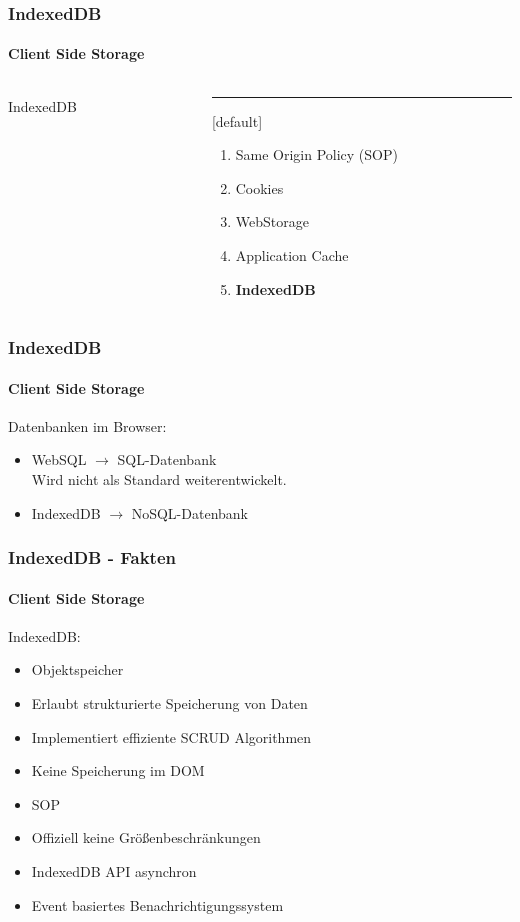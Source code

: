 \begin{frame}
\frametitle{IndexedDB}
\framesubtitle{Client Side Storage}
\begin{columns}[T] %
\begin{column}{.48\textwidth}

\begin{center}
{\Huge IndexedDB}
\end{center}

\end{column}%
\hfill%
\begin{column}{.48\textwidth}
\color{blue}\rule{\linewidth}{4pt}

	[default]
	\begin{enumerate}
		\item Same Origin Policy (SOP)
		\item Cookies
		\item WebStorage
		\item Application Cache
		\item \textbf{IndexedDB}
	\end{enumerate}
\end{column}%
\end{columns}
\end{frame}
\begin{frame}
\frametitle{IndexedDB}
\framesubtitle{Client Side Storage}

Datenbanken im Browser:
\begin{itemize}
	\item WebSQL $\rightarrow$ SQL-Datenbank \\
		Wird nicht als Standard weiterentwickelt.
	\item IndexedDB $ \rightarrow$ NoSQL-Datenbank
\end{itemize}

\end{frame}
\begin{frame}
\frametitle{IndexedDB - Fakten}
\framesubtitle{Client Side Storage}

IndexedDB:
\begin{itemize}
	\item Objektspeicher
	\item Erlaubt strukturierte Speicherung von Daten
	\item Implementiert effiziente SCRUD Algorithmen
	\item Keine Speicherung im DOM
	\item SOP
	\item Offiziell keine Größenbeschränkungen	
	\item IndexedDB API asynchron
	\item Event basiertes Benachrichtigungssystem
\end{itemize}

\end{frame}
